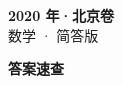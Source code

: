 \documentclass[zihao=-4, a4paper]{ctexart}
\begin{document}
\begin{center}
  {\Large\bfseries 2020 年·北京卷}\\[4pt]
  {\large 数学 · 简答版}
\end{center}
\medskip
{}

\clearpage
{}
\begin{center}{\Large\bfseries 答案速查}\end{center}
\medskip

\end{document}
